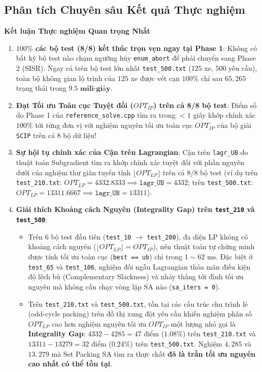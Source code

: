 \documentclass[11pt,a4paper]{article}
\theoremstyle{definition}
\newenvironment{optbox}[1]{%
    \par\medskip\noindent
    \begin{lrbox}{\calloutbox}%
    \begin{minipage}{\dimexpr\linewidth-2\fboxsep-2\fboxrule\relax}
    \textbf{\textcolor{accentgreen}{#1}}\par\smallskip
}{%
    \end{minipage}%
    \end{lrbox}%
    \fcolorbox{accentgreen}{softgreen}{\usebox{\calloutbox}}%
    \par\medskip
}
\begin{document}
\subsection{Phân tích Chuyên sâu Kết quả Thực nghiệm}

\begin{optbox}{Kết luận Thực nghiệm Quan trọng Nhất}
\begin{enumerate}[leftmargin=1.5em]
    \item \textbf{$100\%$ các bộ test (8/8) kết thúc trọn vẹn ngay tại Phase 1}: Không có bất kỳ bộ test nào chạm ngưỡng hủy \texttt{enum\_abort} để phải chuyển sang Phase 2 (SISR). Ngay cả trên bộ test lớn nhất \texttt{test\_500.txt} ($125$ xe, $500$ yêu cầu), toàn bộ không gian lộ trình của $125$ xe được vét cạn $100\%$ chỉ sau $65,265$ trạng thái trong $\mathbf{9.5\text{ mili-giây}}$.
    \item \textbf{Đạt Tối ưu Toàn cục Tuyệt đối ($OPT_{IP}$) trên cả 8/8 bộ test}: Điểm số do Phase 1 của \texttt{reference\_solve.cpp} tìm ra trong $<1$ giây khớp chính xác $100\%$ tới từng đơn vị với nghiệm nguyên tối ưu toàn cục $OPT_{IP}$ của bộ giải \texttt{SCIP} trên cả 8 bộ dữ liệu!
    \item \textbf{Sự hội tụ chính xác của Cận trên Lagrangian}: Cận trên \texttt{lagr\_UB} do thuật toán Subgradient tìm ra khớp chính xác tuyệt đối với phần nguyên dưới của nghiệm thư giãn tuyến tính $\lfloor OPT_{LP} \rfloor$ trên cả 8/8 bộ test (ví dụ trên \texttt{test\_210.txt}: $OPT_{LP} = 4332.8333 \implies \texttt{lagr\_UB} = 4332$; trên \texttt{test\_500.txt}: $OPT_{LP} = 13311.6667 \implies \texttt{lagr\_UB} = 13311$).
    \item \textbf{Giải thích Khoảng cách Nguyên (Integrality Gap) trên \texttt{test\_210} và \texttt{test\_500}}:
    \begin{itemize}[leftmargin=1.2em]
        \item Trên 6 bộ test đầu tiên (\texttt{test\_10} $\to$ \texttt{test\_200}), đa diện LP không có khoảng cách nguyên ($\lfloor OPT_{LP} \rfloor = OPT_{IP}$), nên thuật toán tự chứng minh được tính tối ưu toàn cục (\texttt{best == ub}) chỉ trong $1\sim 62\text{ ms}$. Đặc biệt ở \texttt{test\_65} và \texttt{test\_106}, nghiệm đối ngẫu Lagrangian thỏa mãn điều kiện độ lệch bù (Complementary Slackness) và nhảy thẳng tới đỉnh tối ưu nguyên mà không cần chạy vòng lặp SA nào (\texttt{sa\_iters = 0}).
        \item Trên \texttt{test\_210.txt} và \texttt{test\_500.txt}, tồn tại các cấu trúc chu trình lẻ (odd-cycle packing) trên đồ thị xung đột yêu cầu khiến nghiệm phân số $OPT_{LP}$ cao hơn nghiệm nguyên tối ưu $OPT_{IP}$ một lượng nhỏ gọi là \textbf{Integrality Gap}: $4332 - 4285 = 47$ điểm ($1.08\%$) trên \texttt{test\_210.txt} và $13311 - 13279 = 32$ điểm ($0.24\%$) trên \texttt{test\_500.txt}. Nghiệm $4,285$ và $13,279$ mà Set Packing SA tìm ra thực chất \textbf{đã là trần tối ưu nguyên cao nhất có thể tồn tại}.
    \end{itemize}
\end{enumerate}
\end{optbox}
\end{document}
